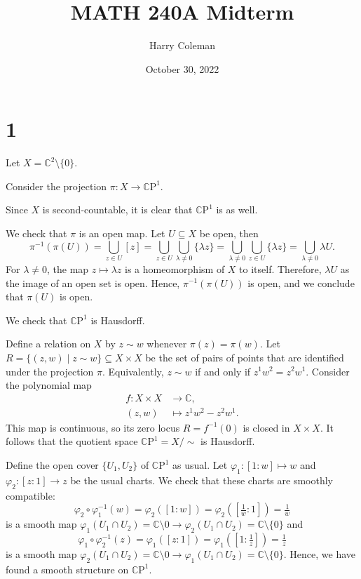 \documentclass[12pt]{article}
\renewcommand{\maketitle}{\thispagestyle{title}}
\theoremstyle{definition}
\newcommand{\C}{\mathbb{C}}
\renewcommand{\phi}{\varphi}
\newcommand{\<}{\langle}
\renewcommand{\>}{\rangle}
\newcommand{\seq}{\subseteq}
\newcommand{\CP}{\mathbb{C}\mathrm{P}}
\begin{document}
\title{MATH 240A Midterm}
\author{Harry Coleman}
\date{October 30, 2022}
\maketitle

\section*{1}

Let $X = \C^2 \setminus \{0\}$.

Consider the projection $\pi : X \to \CP^1$.

Since $X$ is second-countable, it is clear that $\CP^1$ is as well.

We check that $\pi$ is an open map.
Let $U \seq X$ be open, then
\[
    \pi^{-1}(\pi(U))
        = \bigcup_{z \in U} [z]
        = \bigcup_{z \in U} \bigcup_{\lambda \ne 0} \{\lambda z\}
        = \bigcup_{\lambda \ne 0} \bigcup_{z \in U} \{\lambda z\}
        = \bigcup_{\lambda \ne 0} \lambda U.
\]
For $\lambda \ne 0$, the map $z \mapsto \lambda z$ is a homeomorphism of $X$ to itself.
Therefore, $\lambda U$ as the image of an open set is open.
Hence, $\pi^{-1}(\pi(U))$ is open, and we conclude that $\pi(U)$ is open.

We check that $\CP^1$ is Hausdorff.

Define a relation on $X$ by $z \sim w$ whenever $\pi(z) = \pi(w)$.
Let $R = \{(z, w) \mid z \sim w\} \seq X \times X$ be the set of pairs of points that are identified under the projection $\pi$.
Equivalently, $z \sim w$ if and only if $z^1w^2 = z^2w^1$.
Consider the polynomial map
\begin{align*}
    f : X \times X &\longrightarrow \C, \\
        (z, w) &\longmapsto z^1w^2 - z^2w^1.
\end{align*}
This map is continuous, so its zero locus $R = f^{-1}(0)$ is closed in $X \times X$.
It follows that the quotient space $\CP^1 = X/{\sim}$ is Hausdorff.

Define the open cover $\{U_1, U_2\}$ of $\CP^1$ as usual.
Let $\phi_1 : [1 : w] \mapsto w$ and $\phi_2 : [z : 1] \to z$ be the usual charts.
We check that these charts are smoothly compatible:
\[
    \phi_2 \circ \phi_1^{-1}(w)
        = \phi_2([1 : w])
        = \phi_2([\tfrac{1}{w} : 1])  
        = \tfrac{1}{w}
\]
is a smooth map $\phi_1(U_1 \cap U_2) = \C \setminus 0 \to \phi_2(U_1 \cap U_2) = \C \setminus \{0\}$ and 
\[
    \phi_1 \circ \phi_2^{-1}(z)
        = \phi_1([z : 1])
        = \phi_1([1 : \tfrac{1}{z}])  
        = \tfrac{1}{z}
\]
is a smooth map $\phi_2(U_1 \cap U_2) = \C \setminus 0 \to \phi_1(U_1 \cap U_2) = \C \setminus \{0\}$.
Hence, we have found a smooth structure on $\CP^1$.
\end{document}

